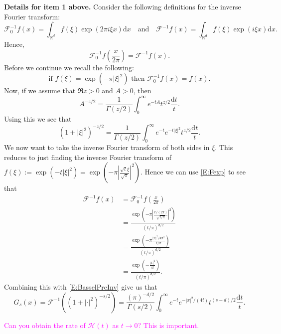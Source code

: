 \documentclass{article}
\numberwithin{equation}{section}
\newcommand{\R}{\mathbb{R}}
\newcommand{\ud}{\ensuremath{\mathrm{d}}}
\begin{document}
\bigskip
\textbf{Details for item 1 above.} Consider the following definitions for the inverse Fourier transform:
	\[
		\mathcal{F}_0^{-1}f(x) = \int_{\R^d} f(\xi) \exp(2 \pi i \xi x) \ud x \quad \text{and} \quad \mathcal{F}^{-1}f(x) = \int_{\R^d} f(\xi) \exp(i \xi x) \ud x.
	\]
Hence,
	\[
			\mathcal{F}_0^{-1}f\left(\frac{x}{2\pi}\right) = 	\mathcal{F}^{-1}f(x).
	\]
Before we continue we recall the following:
	\begin{equation}
	\label{E:Fexp}
		\text{if } f(\xi) = \exp(-\pi |\xi|^2) \text{ then } \mathcal{F}_0^{-1}f(x) = f(x).
	\end{equation}
Now, if we assume that $\Re z>0$ and $A>0$, then
	\[
		A^{-z/2} = \frac{1}{\Gamma(z/2)} \int_0^\infty e^{-tA}t^{z/2} \frac{\ud t}{t}.
	\]
Using this we see that
	\begin{equation}
	\label{E:BasselPreInv}
		(1+|\xi|^2)^{-z/2} = \frac{1}{\Gamma(z/2)} \int_0^\infty e^{-t} e^{-t|\xi|^2} t^{z/2} \frac{\ud t}{t}.
	\end{equation}
We now want to take the inverse Fourier transform of both sides in $\xi$. This reduces to just finding the inverse Fourier transform of $f(\xi) := \exp(-t|\xi|^2) = \exp\left(-\pi \left| \frac{\sqrt{t} \xi}{\sqrt{\pi}} \right|^2\right)$. Hence we can use \eqref{E:Fexp} to see that
	\begin{align*}
		\mathcal{F}^{-1}f(x) &= \mathcal{F}_0^{-1}f\left(\frac{x}{2\pi}\right) \\
		&= \frac{\exp\left(-\pi \left| \frac{x/(2\pi)}{\sqrt{t/\pi}} \right|^2\right)}{(t/\pi)^{d/2}} \\
		&= \frac{\exp\left(-\pi \frac{|x|^2/4 \pi^2}{t/\pi} \right)}{(t/\pi)^{d/2}} \\
		&= \frac{\exp\left(- \frac{|x|^2}{4t} \right)}{(t/\pi)^{d/2}}.
	\end{align*}
Combining this with \eqref{E:BasselPreInv} give us that
	\[
		G_s(x) = \mathcal{F}^{-1}((1+|\cdot|^{2})^{-s/2}) = \frac{(\pi)^{-d/2}}{\Gamma(s/2)}\int_0^\infty e^{-t}e^{-|x|^2/(4t)} t^{(s-d)/2} \frac{\ud t}{t}.
	\]

\bigskip
\textcolor{magenta}{Can you obtain the rate of $\mathcal{H}(t)$ as $t\to 0$?
This is important.}
\end{document}
